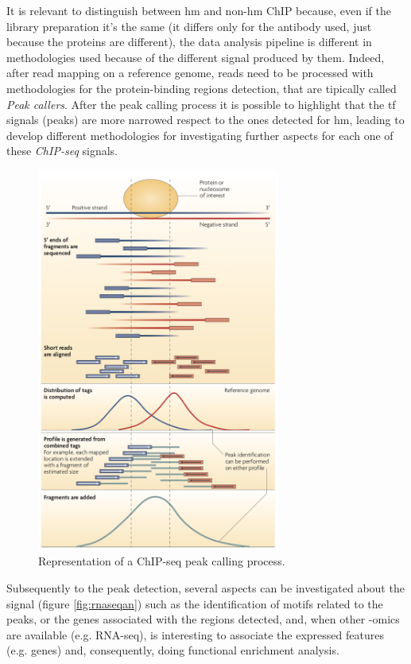 It is relevant to distinguish between \gls{hm} and non-\gls{hm} ChIP because, even if the library preparation it's the same (it differs only for the antibody used, just because the proteins are different), the data analysis pipeline is different in methodologies used because of the different signal produced by them.
Indeed, after read mapping on a reference genome, reads need to be processed with methodologies for the protein-binding regions detection, that are tipically called \textit{Peak callers}.
After the peak calling process it is possible to  highlight that the \gls{tf} signals (peaks) are more narrowed respect to the ones detected for \gls{hm}, leading to develop different methodologies for investigating further aspects for each one of these \textit{ChIP-seq} signals.

\begin{figure}[H]
\centering
\includegraphics[width=8cm, keepaspectratio]{img/intro/peak_call.png}
\caption[ChIP-seq peak detection]{Representation of a  ChIP-seq peak calling process. \cite{Park2009}}
\label{fig:chipseqexp}
\end{figure}

Subsequently to the peak detection, several aspects can be investigated about the signal (figure \ref{fig:rnaseqan}) such as the identification of motifs related to the peaks, or the genes associated with the regions detected, and, when other -omics are available (e.g. RNA-seq), is interesting to associate the expressed features (e.g. genes) and, consequently,  doing functional enrichment analysis. 